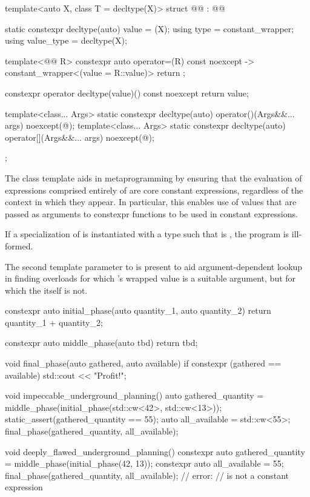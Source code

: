 \begin{codeblock}
{  template<auto X, class T = decltype(X)>
  struct @@ : @@ {
    static constexpr decltype(auto) value = (X);
    using type = constant_wrapper;
    using value_type = decltype(X);

    template<@@ R>
      constexpr auto operator=(R) const noexcept
        -> constant_wrapper<(value = R::value)> { return {}; }

    constexpr operator decltype(value)() const noexcept { return value; }

    template<class... Args>
      static constexpr decltype(auto) operator()(Args&&... args) noexcept(@\seebelow@);
    template<class... Args>
      static constexpr decltype(auto) operator[](Args&&... args) noexcept(@\seebelow@);
  };
}
\end{codeblock}

\pnum
The class template  aids in metaprogramming by ensuring
that the evaluation of expressions comprised entirely of 
are core constant expressions,
regardless of the context in which they appear.
In particular, this enables use of  values
that are passed as arguments to constexpr functions to be used in constant expressions.

\pnum
If a specialization of  is instantiated with a type 
such that  is ,
the program is ill-formed.
\begin{note}
The second template parameter to  is present
to aid argument-dependent lookup
in finding overloads for which 's wrapped value is a suitable argument,
but for which the  itself is not.
\end{note}

\pnum
\begin{example}
\begin{codeblock}
  constexpr auto initial_phase(auto quantity_1, auto quantity_2) {
    return quantity_1 + quantity_2;
  }

  constexpr auto middle_phase(auto tbd) {
    return tbd;
  }

  void final_phase(auto gathered, auto available) {
    if constexpr (gathered == available)
      std::cout << "Profit!\n";
  }

  void impeccable_underground_planning() {
    auto gathered_quantity = middle_phase(initial_phase(std::cw<42>, std::cw<13>));
    static_assert(gathered_quantity == 55);
    auto all_available = std::cw<55>;
    final_phase(gathered_quantity, all_available);
  }

  void deeply_flawed_underground_planning() {
    constexpr auto gathered_quantity = middle_phase(initial_phase(42, 13));
    constexpr auto all_available = 55;
    final_phase(gathered_quantity, all_available);  // error: 
                                                    // is not a constant expression
  }
\end{codeblock}
\end{example}

